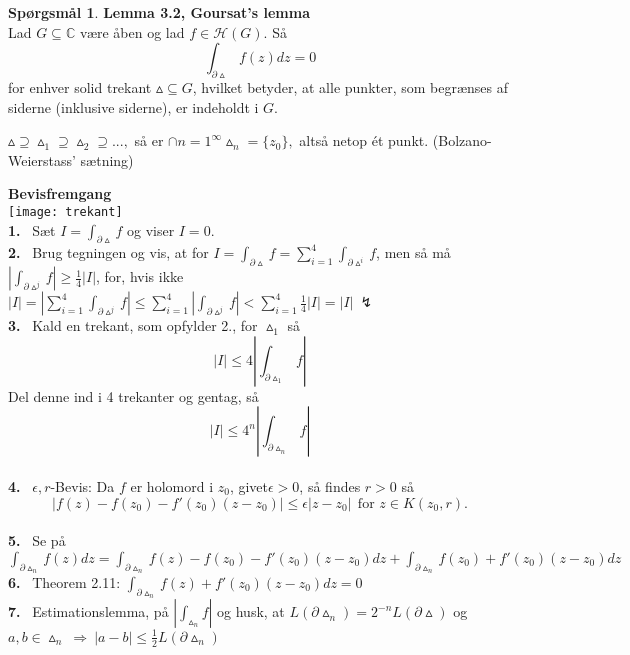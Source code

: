 \documentclass[10pt,a4paper]{article}
\theoremstyle{definition}
\newtheorem{Prob}{Spørgsmål}
\begin{document}
\newpage
\begin{Prob}{\textbf{Lemma 3.2, Goursat's lemma}} \\

Lad $G \subseteq \mathbb{C}$ være åben og lad $f \in \mathcal{H} (G)$. Så
$$ \int_{\partial \vartriangle} f(z) dz = 0$$
for enhver solid trekant $\vartriangle \subseteq G$, hvilket betyder, at alle punkter, som begrænses af siderne (inklusive siderne), er indeholdt i $G$.
\end{Prob}


\begin{framed}
$\vartriangle \supseteq \vartriangle_1 \supseteq \vartriangle_2 \supseteq ...,$ så er $\cap{n=1}^\infty \vartriangle_n = \{z_0\},$ altså netop ét punkt. (Bolzano-Weierstass' sætning) \\
\end{framed}

\begin{framed}
\textbf{Bevisfremgang} \\
\texttt{[image: trekant]} \\
\textbf{1.} \ Sæt $I = \int_{\partial \vartriangle} f$ og viser $I=0$. \\
\textbf{2.} \ Brug tegningen og vis, at for $I = \int_{\partial \vartriangle} f = \sum\limits_{i=1}^4 \int_{\partial \vartriangle^i} f$, men så må $\left| \int_{\partial \vartriangle^j} f \right| \geq \frac{1}{4}|I|$, for, hvis ikke $\left| I \right| = \left| \sum\limits_{i=1}^4 \int_{\partial \vartriangle^j} f \right| \leq  \sum\limits_{i=1}^4 \left| \int_{\partial \vartriangle^j} f \right| < \sum\limits_{i=1}^4 \frac{1}{4} \left| I \right| = |I| \ \lightning$ \\
\textbf{3.} \ Kald en trekant, som opfylder 2., for $\vartriangle_1$ så 
$$ \left| I \right| \leq  4 \left| \int_{\partial \vartriangle_1} f \right|$$
Del denne ind i 4 trekanter og gentag, så
$$ \left| I \right| \leq 4^n  \left| \int_{\partial \vartriangle_n} f \right|$$ \\
\textbf{4.} \  $\epsilon,r$-Bevis: Da $f$ er holomord i $z_0$, givet$\epsilon > 0$, så findes $r > 0$ så
$$\left| f(z) - f(z_0) - f'(z_0)(z-z_0) \right| \leq \epsilon \left| z-z_0 \right| \ \ \text{for } z \in K(z_0,r). $$\\
\textbf{5.} \ Se på $\int_{\partial \vartriangle_n} f(z) dz = \int_{\partial \vartriangle_n} f(z) - f(z_0) - f'(z_0)(z-z_0)dz
+ \int_{\partial \vartriangle_n} f(z_0) + f'(z_0) (z-z_0) dz$ \\
\textbf{6.} \ Theorem 2.11: $\int_{\partial \vartriangle_n} f (z) + f'(z_0)(z-z_0) dz = 0$ \\
\textbf{7.} \ Estimationslemma, på $\left| \int_{\vartriangle_n} f \right|$ og husk, at  $L(\partial \vartriangle_n) = 2^{-n} L (\partial \vartriangle)$ og $a,b \in \vartriangle_n \ \Rightarrow \ \left| a-b \right| \leq \frac{1}{2} L (\partial \vartriangle_n)$
\end{framed}
\end{document}
